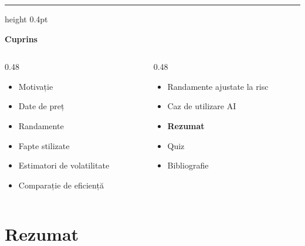 \documentclass[9pt, aspectratio=169, t]{beamer}
\theoremstyle{definition}
\begin{document}
{
\begin{frame}{}
    {\color{FooterGray}\hrule height 0.4pt}
    \vspace{0.1cm}
    {\Large\textcolor{IDAred}{\textbf{Cuprins}}}
    \vspace{0.2cm}
    {\small
    \begin{columns}[T]
        \begin{column}{0.48\textwidth}
            \begin{itemize}
                \item Motivație \checkmark
                \item Date de preț \checkmark
                \item Randamente \checkmark
                \item Fapte stilizate \checkmark
                \item Estimatori de volatilitate \checkmark
                \item Comparație de eficiență \checkmark
            \end{itemize}
        \end{column}
        \begin{column}{0.48\textwidth}
            \begin{itemize}
                \item Randamente ajustate la risc \checkmark
                \item Caz de utilizare AI \checkmark
                \item \textbf{Rezumat}
                \item Quiz
                \item Bibliografie
            \end{itemize}
        \end{column}
    \end{columns}
    }
\end{frame}
}

\section{Rezumat}
\end{document}
